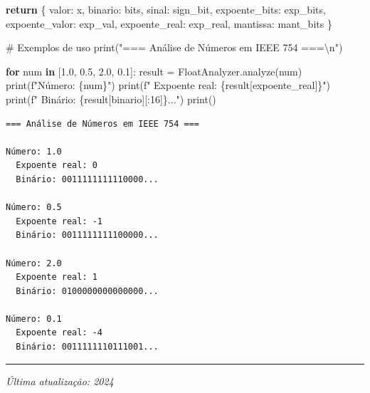 \documentclass[
  11pt,
  letterpaper,
  DIV=11,
  numbers=noendperiod]{scrartcl}
\newenvironment{Shaded}{\begin{snugshade}}{\end{snugshade}}
\newcommand{\BuiltInTok}[1]{\textcolor[rgb]{0.00,0.23,0.31}{#1}}
\newcommand{\CharTok}[1]{\textcolor[rgb]{0.13,0.47,0.30}{#1}}
\newcommand{\CommentTok}[1]{\textcolor[rgb]{0.37,0.37,0.37}{#1}}
\newcommand{\ControlFlowTok}[1]{\textcolor[rgb]{0.00,0.23,0.31}{\textbf{#1}}}
\newcommand{\DecValTok}[1]{\textcolor[rgb]{0.68,0.00,0.00}{#1}}
\newcommand{\FloatTok}[1]{\textcolor[rgb]{0.68,0.00,0.00}{#1}}
\newcommand{\KeywordTok}[1]{\textcolor[rgb]{0.00,0.23,0.31}{\textbf{#1}}}
\newcommand{\NormalTok}[1]{\textcolor[rgb]{0.00,0.23,0.31}{#1}}
\newcommand{\OperatorTok}[1]{\textcolor[rgb]{0.37,0.37,0.37}{#1}}
\newcommand{\SpecialCharTok}[1]{\textcolor[rgb]{0.37,0.37,0.37}{#1}}
\newcommand{\SpecialStringTok}[1]{\textcolor[rgb]{0.13,0.47,0.30}{#1}}
\newcommand{\StringTok}[1]{\textcolor[rgb]{0.13,0.47,0.30}{#1}}
\begin{document}
\begin{Shaded}
\begin{Highlighting}[]
        \ControlFlowTok{return}\NormalTok{ \{}
            \StringTok{\textquotesingle{}valor\textquotesingle{}}\NormalTok{: x,}
            \StringTok{\textquotesingle{}binario\textquotesingle{}}\NormalTok{: bits,}
            \StringTok{\textquotesingle{}sinal\textquotesingle{}}\NormalTok{: sign\_bit,}
            \StringTok{\textquotesingle{}expoente\_bits\textquotesingle{}}\NormalTok{: exp\_bits,}
            \StringTok{\textquotesingle{}expoente\_valor\textquotesingle{}}\NormalTok{: exp\_val,}
            \StringTok{\textquotesingle{}expoente\_real\textquotesingle{}}\NormalTok{: exp\_real,}
            \StringTok{\textquotesingle{}mantissa\textquotesingle{}}\NormalTok{: mant\_bits}
\NormalTok{        \}}

\CommentTok{\# Exemplos de uso}
\BuiltInTok{print}\NormalTok{(}\StringTok{"=== Análise de Números em IEEE 754 ===}\CharTok{\textbackslash{}n}\StringTok{"}\NormalTok{)}

\ControlFlowTok{for}\NormalTok{ num }\KeywordTok{in}\NormalTok{ [}\FloatTok{1.0}\NormalTok{, }\FloatTok{0.5}\NormalTok{, }\FloatTok{2.0}\NormalTok{, }\FloatTok{0.1}\NormalTok{]:}
\NormalTok{    result }\OperatorTok{=}\NormalTok{ FloatAnalyzer.analyze(num)}
    \BuiltInTok{print}\NormalTok{(}\SpecialStringTok{f"Número: }\SpecialCharTok{\{}\NormalTok{num}\SpecialCharTok{\}}\SpecialStringTok{"}\NormalTok{)}
    \BuiltInTok{print}\NormalTok{(}\SpecialStringTok{f"  Expoente real: }\SpecialCharTok{\{}\NormalTok{result[}\StringTok{\textquotesingle{}expoente\_real\textquotesingle{}}\NormalTok{]}\SpecialCharTok{\}}\SpecialStringTok{"}\NormalTok{)}
    \BuiltInTok{print}\NormalTok{(}\SpecialStringTok{f"  Binário: }\SpecialCharTok{\{}\NormalTok{result[}\StringTok{\textquotesingle{}binario\textquotesingle{}}\NormalTok{][:}\DecValTok{16}\NormalTok{]}\SpecialCharTok{\}}\SpecialStringTok{..."}\NormalTok{)}
    \BuiltInTok{print}\NormalTok{()}
\end{Highlighting}
\end{Shaded}

\begin{verbatim}
=== Análise de Números em IEEE 754 ===

Número: 1.0
  Expoente real: 0
  Binário: 0011111111110000...

Número: 0.5
  Expoente real: -1
  Binário: 0011111111100000...

Número: 2.0
  Expoente real: 1
  Binário: 0100000000000000...

Número: 0.1
  Expoente real: -4
  Binário: 0011111110111001...
\end{verbatim}

\begin{center}\rule{0.5\linewidth}{0.5pt}\end{center}

\emph{Última atualização: 2024}
\end{document}
